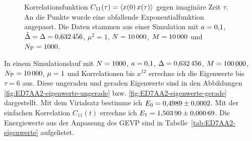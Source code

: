 \begin{figure}[htbp]
    \centering
    \caption{%
        Korrelationsfunktion $C_{11}(\tau) = \langle x(0) \, x(\tau) \rangle$ gegen
        imaginäre Zeit $\tau$. An die Punkte wurde eine abfallende
        Exponentialfunktion angepasst. Die Daten stammen aus einer Simulation
        mit $a = \num{0.1}$, $\tilde \Delta = \Delta =
        \num{0.632456}$, $\mu^2 = \num{1}$, $N = \num{10000}$,
        $M = \num{10000}$ und $N_\text P = \num{1000}$.
    }
    \label{fig:84DAA2-correlation}
\end{figure}

In einem Simulationslauf mit $N = \num{1000}$, $a =
\num{0.1}$, $\Delta = \num{0.632456}$, $M = \num{100000}$,
$N_\text P = \num{10000}$, $\mu = \num{1}$ und Korrelationen bis
$x^{12}$ errechne ich die Eigenwerte bis $\tau = \num{6}$ aus. Diese ungeraden
und geraden Eigenwerte sind in den Abbildungen
\ref{fig:ED7AA2-eigenwerte-ungerade} bzw. \ref{fig:ED7AA2-eigenwerte-gerade}
dargestellt. Mit dem Virialsatz bestimme ich $E_0 = \num{0.4989 +- 0.0002}$.
Mit der einfachen Korrelation $C_{11}(t)$ errechne ich $E_1 = \num{1.50390 +-
0.00069}$. Die Energiewerte aus der Anpassung des GEVP sind in
Tabelle~\ref{tab:ED7AA2-eigenwerte} aufgelistet.

